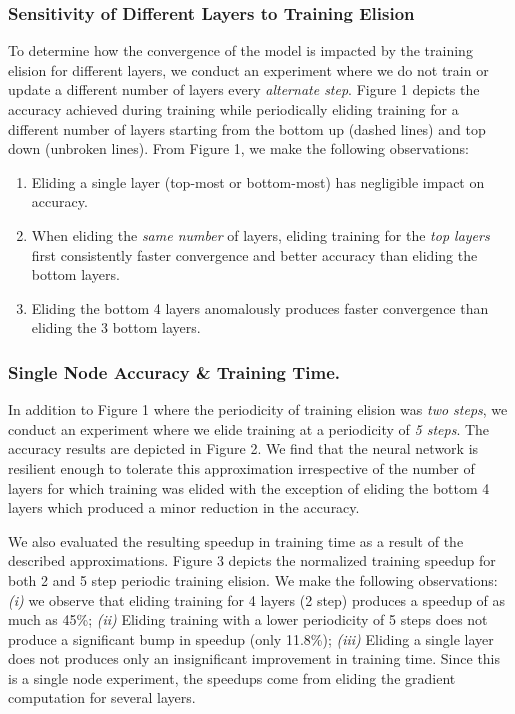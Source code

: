 \subsubsection{Sensitivity of Different Layers to Training Elision}
To determine how the convergence of the model is impacted by the training elision for different layers, we conduct an experiment where we do not train or update a different number of layers every \emph{alternate step}. Figure 1 depicts the accuracy achieved during training while periodically eliding training for a different number of layers starting from the bottom up (dashed lines) and top down (unbroken lines). 
From Figure 1, we make the following observations: 
\begin{enumerate}
\item Eliding a single layer (top-most or bottom-most) has negligible impact on accuracy.
\item When eliding the \emph{same number} of layers, eliding training for the \emph{top layers} first consistently faster convergence and better accuracy than eliding the bottom layers.
\item Eliding the bottom 4 layers anomalously produces faster convergence than eliding the 3 bottom layers. 
\end{enumerate}
\subsubsection{Single Node Accuracy \& Training Time.}
In addition to Figure 1 where the periodicity of training elision was \emph{two steps}, we conduct an experiment where we elide training at a periodicity of \emph{5 steps}. The accuracy results are depicted in Figure 2. We find that the neural network is resilient enough to tolerate this approximation irrespective of the number of layers for which training was elided with the exception of eliding the bottom 4 layers which produced a minor reduction in the accuracy. 

We also evaluated the resulting speedup in training time as a result of the described approximations. Figure 3 depicts the normalized training speedup for both 2 and 5 step periodic training elision. We make the following observations: \emph{(i)} we observe that eliding training for 4 layers (2 step) produces a speedup of as much as 45\%; \emph{(ii)} Eliding training with a lower periodicity of 5 steps does not produce a significant bump in speedup (only 11.8\%); \emph{(iii)} Eliding a single layer does not produces only an insignificant improvement in training time. 
Since this is a single node experiment, the speedups come from eliding the gradient computation for several layers.  


